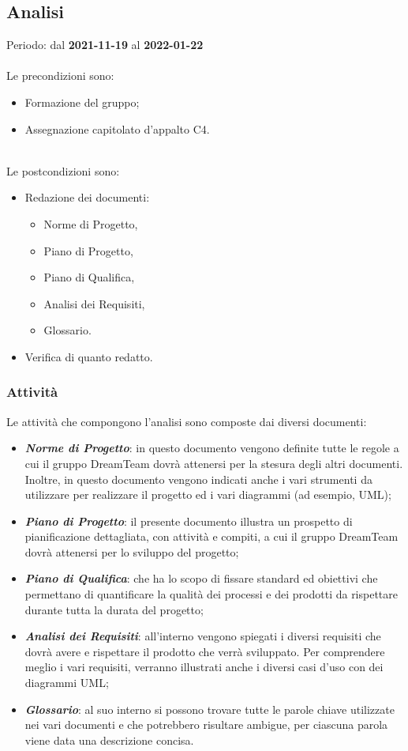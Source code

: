 
\subsection{Analisi} 
Periodo: dal \textbf{2021-11-19} al \textbf{2022-01-22}  \mbox{} \\ \mbox{} \\
Le precondizioni sono:
\begin{itemize}
\item Formazione del gruppo;
\item Assegnazione capitolato\glo{} d’appalto C4.
\end{itemize}  \mbox{} \\
Le postcondizioni sono:
\begin{itemize}
\item Redazione dei documenti:
\begin{itemize}
	\item Norme di Progetto,
	\item Piano di Progetto,
	\item Piano di Qualifica,
	\item Analisi dei Requisiti,
	\item Glossario.
\end{itemize}
\item Verifica di quanto redatto.
\end{itemize}

\subsubsection{Attività}

Le attività che compongono l’analisi sono composte dai diversi documenti:

\begin{itemize}
\item \textbf{\textit{Norme di Progetto}}: in questo documento vengono definite tutte le regole a cui il gruppo DreamTeam dovrà attenersi per la stesura degli altri documenti. Inoltre, in questo documento vengono indicati anche i vari strumenti da utilizzare per realizzare il progetto ed i vari diagrammi (ad esempio, UML\glo{});  
\item \textbf{\textit{Piano di Progetto}}: il presente documento illustra un prospetto di pianificazione dettagliata, con attività e compiti, a cui il gruppo DreamTeam dovrà attenersi per lo sviluppo del progetto;
\item \textbf{\textit{Piano di Qualifica}}: che ha lo scopo di fissare standard ed obiettivi che permettano di quantificare la qualità dei processi e dei prodotti da rispettare durante tutta la durata del progetto;
\item \textbf{\textit{Analisi dei Requisiti}}: all’interno vengono spiegati i diversi requisiti che dovrà avere e rispettare il prodotto che verrà sviluppato. Per comprendere meglio i vari requisiti, verranno illustrati anche i diversi casi d’uso con dei diagrammi UML;
\item \textbf{\textit{Glossario}}: al suo interno si possono trovare tutte le parole chiave utilizzate nei vari documenti e che potrebbero risultare ambigue, per ciascuna parola viene data una descrizione concisa.
\end{itemize}

